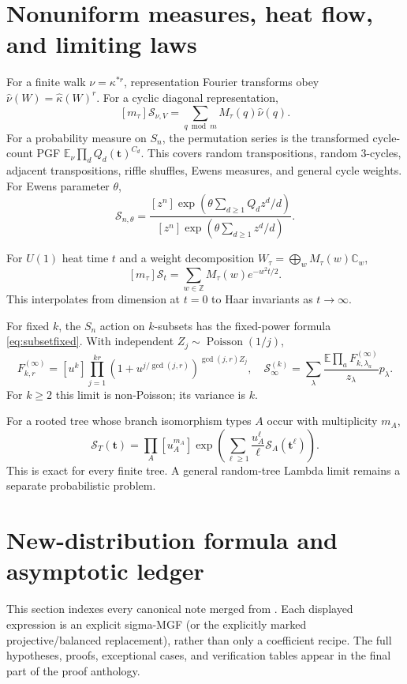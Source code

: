 \documentclass[10pt]{article}
\newcommand{\MGF}{\mathcal S}
\newcommand{\C}{\mathbb C}
\begin{document}
\section{Nonuniform measures, heat flow, and limiting laws}

For a finite walk $\nu=\kappa^{*r}$, representation Fourier transforms obey
$\widehat\nu(W)=\widehat\kappa(W)^r$. For a cyclic diagonal representation,
\[
[m_\tau]\MGF_{\nu,V}=\sum_{q\bmod m}M_\tau(q)\widehat\nu(q).
\]
For a probability measure on $S_n$, the permutation series is the transformed
cycle-count PGF
$\mathbb E_\nu\prod_dQ_d(\mathbf t)^{C_d}$. This covers random transpositions,
random 3-cycles, adjacent transpositions, riffle shuffles, Ewens measures, and
general cycle weights. For Ewens parameter $\theta$,
\[
\MGF_{n,\theta}=\frac{[z^n]\exp(\theta\sum_{d\ge1}Q_dz^d/d)}
{[z^n]\exp(\theta\sum_{d\ge1}z^d/d)}.
\]

For $U(1)$ heat time $t$ and a weight decomposition
$W_\tau=\bigoplus_wM_\tau(w)\C_w$,
\begin{equation}\label{eq:heat}
\boxed{[m_\tau]\MGF_t=\sum_{w\in\mathbb Z}M_\tau(w)e^{-w^2t/2}.}
\end{equation}
This interpolates from dimension at $t=0$ to Haar invariants as
$t\to\infty$.

For fixed $k$, the $S_n$ action on $k$-subsets has the fixed-power formula
\eqref{eq:subsetfixed}. With independent $Z_j\sim\operatorname{Poisson}(1/j)$,
\[
F_{k,r}^{(\infty)}=[u^k]\prod_{j=1}^{kr}
(1+u^{j/\gcd(j,r)})^{\gcd(j,r)Z_j},
\quad
\MGF_\infty^{(k)}=\sum_\lambda\frac{\mathbb E\prod_aF_{k,\lambda_a}^{(\infty)}}
{z_\lambda}p_\lambda.
\]
For $k\ge2$ this limit is non-Poisson; its variance is $k$.

For a rooted tree whose branch isomorphism types $A$ occur with multiplicity
$m_A$,
\begin{equation}\label{eq:tree}
\boxed{\MGF_T(\mathbf t)=\prod_A[u_A^{m_A}]
\exp\!\left(\sum_{\ell\ge1}\frac{u_A^\ell}{\ell}\MGF_A(\mathbf t^\ell)\right).}
\end{equation}
This is exact for every finite tree. A general random-tree Lambda limit remains
a separate probabilistic problem.

\section{New-distribution formula and asymptotic ledger}

This section indexes every canonical note merged from
.
Each displayed expression is an explicit sigma-MGF (or the explicitly marked
projective/balanced replacement), rather than only a coefficient recipe.  The
full hypotheses, proofs, exceptional cases, and verification tables appear in
the final part of the proof anthology.
\end{document}
